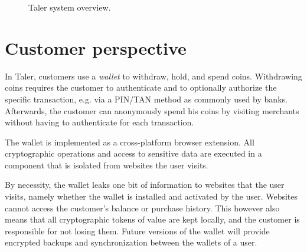 \documentclass[twoside,letterpaper]{sigalternate}
\begin{document}
\begin{figure}[t!]
\centering
{}
\caption{Taler system overview.}
\label{fig:system}
\end{figure}

\section{Customer perspective}

In Taler, customers use a {\em wallet} to withdraw, hold, and spend coins.
Withdrawing coins requires the customer to authenticate and to optionally
authorize the specific transaction, e.g. via a PIN/TAN method as commonly used
by banks.  Afterwards, the customer can anonymously spend his coins by visiting
merchants without having to authenticate for each transaction.

The wallet is implemented as a cross-platform browser extension.  All
cryptographic operations and access to sensitive data are executed in a
component that is isolated from websites the user visits.

By necessity, the wallet leaks one bit of information to websites that the user
visits, namely whether the wallet is installed and activated by the user.
Websites cannot access the customer's balance or purchase history.  This
however also means that all cryptographic tokens of value are kept locally, and
the customer is responsible for not losing them.  Future versions of the wallet
will provide encrypted backups and synchronization between the wallets of a
user.
\end{document}
